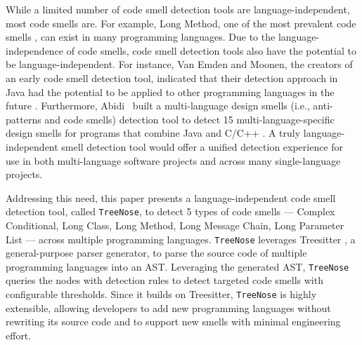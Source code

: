 
While a limited number of code smell detection tools are language-independent,
most code smells are. For example, Long Method, one of the most prevalent code
smells \cite{developersCare}, can exist in many programming languages. Due to
the language-independence of code smells, code smell detection tools also have
the potential to be language-independent. For instance, Van Emden and Moonen,
the creators of an early code smell detection tool, indicated that their
detection approach in Java had the potential to be applied to other programming
languages in the future \cite{1173068}. Furthermore, Abidi~\etal{} built a
multi-language design smells (i.e., anti-patterns and code smells) detection
tool to detect 15 multi-language-specific design smells for programs that
combine Java and C/C++ \cite{MultiLanguageCodeSmells,Fault-Prone}. A truly
language-independent smell detection tool would offer a unified detection
experience for use in both multi-language software projects and across many
single-language projects.


Addressing this need, this paper presents a language-independent code smell
detection tool, called \texttt{TreeNose}, to detect 5 types of code smells ---
Complex Conditional, Long Class, Long Method, Long Message Chain, Long Parameter
List --- across multiple programming languages. \texttt{TreeNose} leverages
Treesitter \cite{treeSitter}, a general-purpose parser generator, to parse the
source code of multiple programming languages into an AST. Leveraging the
generated AST, \texttt{TreeNose} queries the nodes with detection rules to
detect targeted code smells with configurable thresholds. Since it builds on
Treesitter, \texttt{TreeNose} is highly extensible, allowing developers to add
new programming languages without rewriting its source code and to support new
smells with minimal engineering effort.


